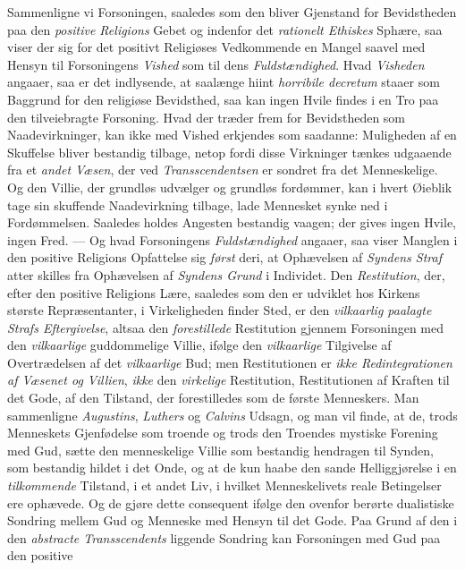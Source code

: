 Sammenligne vi Forsoningen, saaledes som den bliver Gjenstand for Bevidstheden
paa den \emph{positive Religions} Gebet og indenfor det \emph{rationelt
Ethiskes} Sphære, saa viser der sig for det positivt Religiøses Vedkommende en
Mangel saavel med Hensyn til Forsoningens \emph{Vished} som til dens
\emph{Fuldstændighed}. Hvad \emph{Visheden} angaaer, saa er det indlysende, at
saalænge hiint \textit{horribile decretum} staaer som Baggrund for den religiøse
Bevidsthed, saa kan ingen Hvile findes i en Tro paa den tilveiebragte
Forsoning. Hvad der træder frem for Bevidstheden som Naadevirkninger, kan ikke
med Vished erkjendes som saadanne: Muligheden af en Skuffelse bliver bestandig
tilbage, netop fordi disse Virkninger tænkes udgaaende fra et \emph{andet
Væsen}, der ved \emph{Transscendentsen} er sondret fra det Menneskelige. Og den
Villie, der grundløs udvælger og grundløs fordømmer, kan i hvert Øieblik tage
sin skuffende Naadevirkning tilbage, lade Mennesket synke ned i Fordømmelsen.
Saaledes holdes Angesten bestandig vaagen; der gives ingen Hvile, ingen Fred.
--- Og hvad Forsoningens \emph{Fuldstændighed} angaaer, saa viser Manglen i den
positive Religions Opfattelse sig \emph{først} deri, at Ophævelsen af
\emph{Syndens Straf} atter skilles fra Ophævelsen af \emph{Syndens Grund} i
Individet. Den
 \emph{Restitution}, der, efter den positive Religions Lære, saaledes som den er
udviklet hos Kirkens største Repræsentanter, i Virkeligheden finder Sted, er den
\emph{vilkaarlig paalagte Strafs Eftergivelse}, altsaa den \emph{forestillede}
Restitution gjennem Forsoningen med den \emph{vilkaarlige} guddommelige Villie,
ifølge den \emph{vilkaarlige} Tilgivelse af Overtrædelsen af det
\emph{vilkaarlige} Bud; men Restitutionen er \emph{ikke Redintegrationen af
Væsenet og Villien}, \emph{ikke} den \emph{virkelige} Restitution,
Restitutionen af Kraften til det Gode, af den Tilstand, der forestilledes som de
første Menneskers. Man sammenligne \emph{Augustins}, \emph{Luthers} og
\emph{Calvins} Udsagn, og man vil finde, at de, trods Menneskets Gjenfødelse som
troende og trods den Troendes mystiske Forening med Gud, sætte den menneskelige
Villie som bestandig hendragen til Synden, som bestandig hildet i det Onde, og
at de kun haabe den sande Helliggjørelse i en \emph{tilkommende} Tilstand, i et
andet Liv, i hvilket Menneskelivets reale Betingelser ere ophævede. Og de gjøre
dette consequent ifølge den ovenfor berørte dualistiske Sondring mellem Gud og
Menneske med Hensyn til det Gode. Paa Grund af den i den \emph{abstracte
Transscendents} liggende Sondring kan Forsoningen med Gud paa den positive
